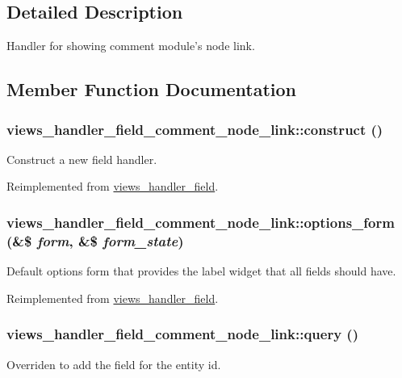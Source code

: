 \subsection{Detailed Description}
Handler for showing comment module's node link. 

\subsection{Member Function Documentation}
\hypertarget{classviews__handler__field__comment__node__link_a6a8823310c2ef5c3a70e6a394e45e699}{
\subsubsection[{construct}]{\setlength{\rightskip}{0pt plus 5cm}views\_\-handler\_\-field\_\-comment\_\-node\_\-link::construct ()}}
\label{classviews__handler__field__comment__node__link_a6a8823310c2ef5c3a70e6a394e45e699}
Construct a new field handler. 

Reimplemented from \hyperlink{classviews__handler__field_a3d50050864c255b71c842972a45d39f6}{views\_\-handler\_\-field}.\hypertarget{classviews__handler__field__comment__node__link_a4a4be3287da8267b5571d1fe404f9070}{
\subsubsection[{options\_\-form}]{\setlength{\rightskip}{0pt plus 5cm}views\_\-handler\_\-field\_\-comment\_\-node\_\-link::options\_\-form (\&\$ {\em form}, \/  \&\$ {\em form\_\-state})}}
\label{classviews__handler__field__comment__node__link_a4a4be3287da8267b5571d1fe404f9070}
Default options form that provides the label widget that all fields should have. 

Reimplemented from \hyperlink{classviews__handler__field_a0435d161922b7b4b84f02a2e79bb947a}{views\_\-handler\_\-field}.\hypertarget{classviews__handler__field__comment__node__link_af48614fab00f4f6b8ec7e68a3d352b20}{
\subsubsection[{query}]{\setlength{\rightskip}{0pt plus 5cm}views\_\-handler\_\-field\_\-comment\_\-node\_\-link::query ()}}
\label{classviews__handler__field__comment__node__link_af48614fab00f4f6b8ec7e68a3d352b20}
Overriden to add the field for the entity id. 


